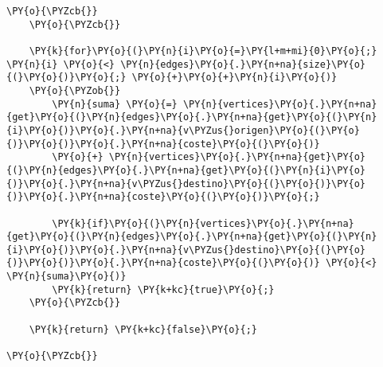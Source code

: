 \begin{Verbatim}[commandchars=\\\{\}]
		\PY{o}{\PYZcb{}}
	\PY{o}{\PYZcb{}}

    \PY{k}{for}\PY{o}{(}\PY{n}{i}\PY{o}{=}\PY{l+m+mi}{0}\PY{o}{;} \PY{n}{i} \PY{o}{<} \PY{n}{edges}\PY{o}{.}\PY{n+na}{size}\PY{o}{(}\PY{o}{)}\PY{o}{;} \PY{o}{+}\PY{o}{+}\PY{n}{i}\PY{o}{)}
	\PY{o}{\PYZob{}}
	    \PY{n}{suma} \PY{o}{=} \PY{n}{vertices}\PY{o}{.}\PY{n+na}{get}\PY{o}{(}\PY{n}{edges}\PY{o}{.}\PY{n+na}{get}\PY{o}{(}\PY{n}{i}\PY{o}{)}\PY{o}{.}\PY{n+na}{v\PYZus{}origen}\PY{o}{(}\PY{o}{)}\PY{o}{)}\PY{o}{.}\PY{n+na}{coste}\PY{o}{(}\PY{o}{)} 
		\PY{o}{+} \PY{n}{vertices}\PY{o}{.}\PY{n+na}{get}\PY{o}{(}\PY{n}{edges}\PY{o}{.}\PY{n+na}{get}\PY{o}{(}\PY{n}{i}\PY{o}{)}\PY{o}{.}\PY{n+na}{v\PYZus{}destino}\PY{o}{(}\PY{o}{)}\PY{o}{)}\PY{o}{.}\PY{n+na}{coste}\PY{o}{(}\PY{o}{)}\PY{o}{;}

	    \PY{k}{if}\PY{o}{(}\PY{n}{vertices}\PY{o}{.}\PY{n+na}{get}\PY{o}{(}\PY{n}{edges}\PY{o}{.}\PY{n+na}{get}\PY{o}{(}\PY{n}{i}\PY{o}{)}\PY{o}{.}\PY{n+na}{v\PYZus{}destino}\PY{o}{(}\PY{o}{)}\PY{o}{)}\PY{o}{.}\PY{n+na}{coste}\PY{o}{(}\PY{o}{)} \PY{o}{<} \PY{n}{suma}\PY{o}{)}
		\PY{k}{return} \PY{k+kc}{true}\PY{o}{;}
	\PY{o}{\PYZcb{}}

    \PY{k}{return} \PY{k+kc}{false}\PY{o}{;}

\PY{o}{\PYZcb{}}
\end{Verbatim}
